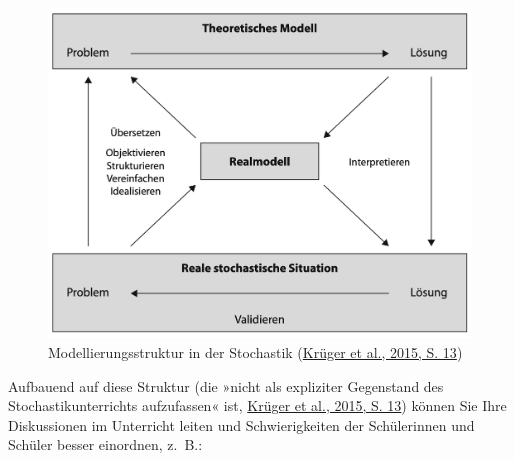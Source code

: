 \documentclass[
]{scrbook}
\theoremstyle{definition}
\theoremstyle{definition}
\theoremstyle{definition}
\theoremstyle{definition}
\theoremstyle{remark}
\begin{document}
\begin{figure}

{\centering \includegraphics[width=0.75\linewidth]{pictures/14-Modelle} 

}

\caption{Modellierungsstruktur in der Stochastik (\protect\hyperlink{ref-Kruger2015}{Krüger et al., 2015, S. 13})}\label{fig:Modelle}
\end{figure}

Aufbauend auf diese Struktur (die »nicht als expliziter Gegenstand des Stochastikunterrichts aufzufassen« ist, \protect\hyperlink{ref-Kruger2015}{Krüger et al., 2015, S. 13}) können Sie Ihre Diskussionen im Unterricht leiten und Schwierigkeiten der Schülerinnen und Schüler besser einordnen, z.~B.:
\end{document}
